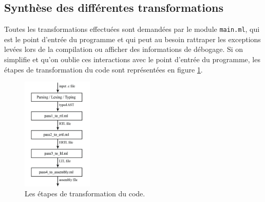 \documentclass[paper=a4, fontsize=11pt]{scrartcl}
\numberwithin{figure}{section}			%
\numberwithin{table}{section}				%
\begin{document}
\subsection{Synthèse des différentes transformations}

Toutes les transformations effectuées sont demandées par le module \texttt{main.ml}, qui est le point d'entrée du programme et qui peut au besoin rattraper les exceptions levées lors de la compilation ou afficher des informations de débogage. Si on simplifie et qu'on oublie ces interactions avec le point d'entrée du programme, les étapes de transformation du code sont représentées en figure \ref{transformations}.

\begin{figure}[!ht]
    \center
    \includegraphics[width=0.3\textwidth]{./images/transformation_flow.jpg}
    \caption{\label{transformations} Les étapes de transformation du code.}
\end{figure}
\end{document}

